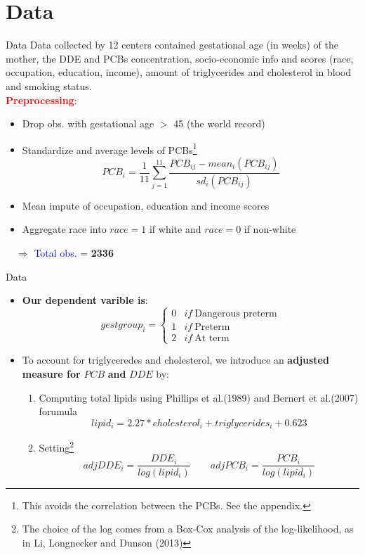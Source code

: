 \documentclass{beamer}\usepackage[]{graphicx}\usepackage[]{color}
\begin{document}
\section{Data}
\begin{frame}{Data}
Data collected by 12 centers contained gestational age (in weeks) of the mother, the DDE and PCBs concentration, socio-economic info and scores (race, occupation, education, income), amount of triglycerides and cholesterol in blood and smoking status. \\
\medskip 
\textcolor{red}{\textbf{Preprocessing}}:
\begin{itemize}
\item Drop obs. with gestational age $>$ 45 (the world record)
\item Standardize and average levels of PCBs\footnote{This avoids the correlation between the PCBs. See the appendix.}
$$PCB_i = \frac{1}{11}\sum_{j=1}^{11} \frac{PCB_{ij} - mean_i(PCB_{ij})}{sd_i(PCB_{ij})}$$
\item Mean impute of occupation, education and income scores 
\item Aggregate race into $race = 1$ if white and $race=0$ if non-white
\end{itemize}
\medskip
$\quad \Longrightarrow$ \textcolor{blue}{Total obs.} = \textbf{2336}
\end{frame}
\begin{frame}{Data}
\small
\begin{itemize}
\item \textbf{Our dependent varible is}:
$$gestgroup_i = 
\begin{cases}
0 & if \ \textrm{Dangerous preterm} \\
1 & if \ \textrm{Preterm} \\
2 & if \ \textrm{At term} 
\end{cases}$$
\item To account for triglyceredes and cholesterol, we introduce an \textbf{adjusted measure for} $PCB$ \textbf{and} $DDE$ by:
\begin{enumerate}
\item Computing total lipids using Phillips et al.(1989) and Bernert et al.(2007) forumula $$lipid_i =  2.27 * cholesterol_i + triglycerides_i + 0.623$$ 
\item Setting\footnote{The choice of the log comes from a Box-Cox analysis of the log-likelihood, as in Li, Longnecker and Dunson (2013)}
$$adjDDE_i = \frac{DDE_i}{log(lipid_i)} \qquad adjPCB_i = \frac{PCB_i}{log(lipid_i)}$$
\end{enumerate}
\end{itemize}
\end{frame}
\end{document}
